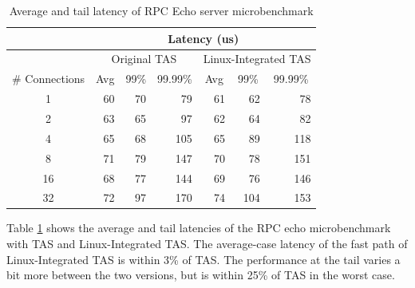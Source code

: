 \begin{table}[]
\begin{tabular}{@{}crrrrrr@{}}
\toprule
               & \multicolumn{6}{c}{Latency (us)}                                                                                                                                    \\ \midrule
               & \multicolumn{3}{c}{Original TAS}                                                          & \multicolumn{3}{c}{Linux-Integrated TAS}                                         \\
\# Connections & \multicolumn{1}{c}{Avg} & \multicolumn{1}{c}{99\%} & \multicolumn{1}{c}{99.99\%} & \multicolumn{1}{c}{Avg} & \multicolumn{1}{c}{99\%} & \multicolumn{1}{c}{99.99\%} \\
1              & 60                      & 70                       & 79                          & 61                      & 62                       & 78                          \\
2              & 63                      & 65                       & 97                          & 62                      & 64                       & 82                          \\
4              & 65                      & 68                       & 105                         & 65                      & 89                       & 118                         \\
8              & 71                      & 79                       & 147                         & 70                      & 78                       & 151                         \\
16             & 68                      & 77                       & 144                         & 69                      & 76                       & 146                         \\
32             & 72                      & 97                       & 170                         & 74                      & 104                      & 153                         \\ \bottomrule
\end{tabular}
\caption{Average and tail latency of RPC Echo server microbenchmark}
\label{tab:fastpath-latency}
\end{table}

Table \ref{tab:fastpath-latency} shows the average and tail latencies of the RPC 
echo microbenchmark with TAS and Linux-Integrated TAS. The average-case latency
of the fast path of Linux-Integrated TAS is within 3\% of TAS. The performance 
at the tail varies a bit more between the two versions, but is within 25\% of 
TAS in the worst case.

